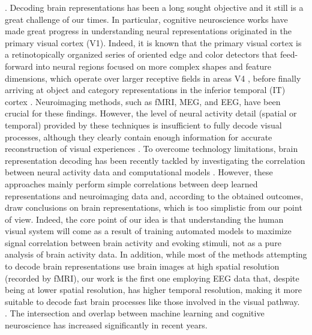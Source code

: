 \documentclass[10pt,journal,compsoc,twocolumn]{IEEEtran}
\begin{document}
. Decoding brain representations has been a long sought objective and it still is a great challenge of our times.
In particular, cognitive neuroscience works have made great progress in understanding neural representations originated in the primary visual cortex (V1).  Indeed, it is known that the primary visual cortex is a retinotopically organized series of oriented edge and color detectors\cite{pmid25681421} that feed-forward into neural regions focused on more complex shapes and feature dimensions, which operate over larger receptive fields in areas V4 \cite{pmid26053241}, before finally arriving at object and category representations in the inferior temporal (IT) cortex \cite{pmid16272124}. 
Neuroimaging methods, such as fMRI, MEG, and EEG, have been crucial for these findings. However, the level of neural activity detail (spatial or temporal) provided by these techniques is  insufficient to fully decode visual processes, although they clearly contain enough information for accurate reconstruction of visual experiences \cite{pmid29176609}. To overcome technology limitations, brain representation decoding has been recently tackled by investigating the correlation between neural activity data and computational models \cite{pmid27282108,pmid28530228}.
However, these approaches mainly perform simple correlations between deep learned representations and neuroimaging data and, according to the obtained outcomes, draw conclusions on brain representations, which is too simplistic from our point of view. Indeed, the core point of our idea is that understanding the human visual system will come as a result of training automated models to maximize signal correlation between brain activity and evoking stimuli, not as a pure analysis of brain activity data. 
In addition, while most of the methods attempting to decode brain representations use brain images at high spatial resolution (recorded by fMRI), our work is the first one employing EEG data that, despite being at lower spatial resolution, has higher temporal resolution, making it more suitable to decode fast brain processes like those involved in the visual pathway.\\

. The intersection and overlap between machine learning and cognitive neuroscience has increased significantly in recent years.
\end{document}

